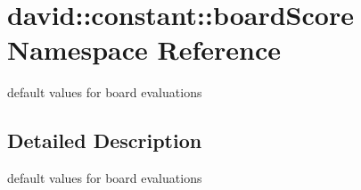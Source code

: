 \hypertarget{namespacedavid_1_1constant_1_1boardScore}{}\section{david\+:\+:constant\+:\+:board\+Score Namespace Reference}
\label{namespacedavid_1_1constant_1_1boardScore}


default values for board evaluations  




\subsection{Detailed Description}
default values for board evaluations 